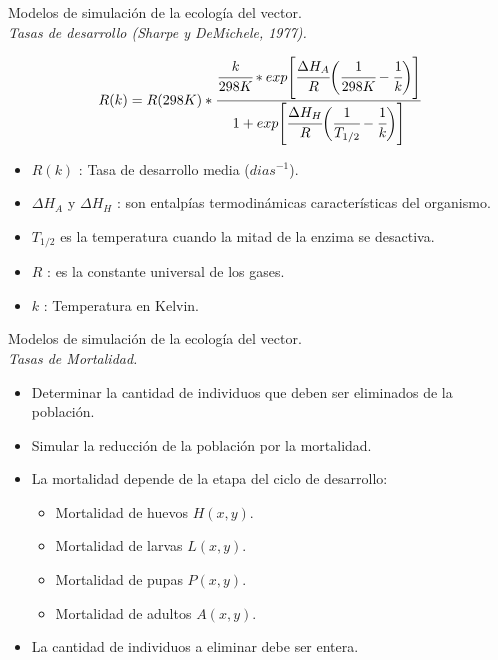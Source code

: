 \begin{frame}[t]{Modelos de simulación de la ecología del vector.\\\textit{Tasas de desarrollo
 (Sharpe y DeMichele, 1977).}}
  \begin{center}
      \begin{equation} \label{eq:schoolfield}
         R(k)  = R(298K) *\cfrac{ \cfrac{k}{298K} *
          exp \Bigg[
                  \cfrac{\Delta H_{A}}{R} \bigg(\cfrac{1}{298K} - \cfrac{1}{k}\bigg)
              \Bigg]}
          {1 + exp\Bigg[\cfrac{\Delta H_{H}}{R} \bigg(\cfrac{1}{T_{1/2}}- \cfrac{1}{k}\bigg)\Bigg] }
      \end{equation}
  \end{center}
   \begin{itemize}
      \item $R(k)$ : Tasa de desarrollo media ($dias^{-1}$).
      \item $\Delta H_{A}$ y $\Delta H_{H}$ : son entalpías termodinámicas características del organismo.
      \item $T_{1/2}$ es la temperatura cuando la mitad de la enzima se desactiva.
      \item $R$ : es la constante universal de los gases.
      \item $k$ : Temperatura en Kelvin.
    \end{itemize}
\end{frame}


\begin{frame}[c]{Modelos de simulación de la ecología del vector.\\\textit{Tasas de Mortalidad.}}
  \begin{itemize}
      \item Determinar la cantidad de individuos que deben ser eliminados de la población.
      \item Simular la reducción de la población por la mortalidad.
      \item La mortalidad depende de la etapa del ciclo de desarrollo:
      \begin{itemize}
		  \item Mortalidad de huevos $H(x, y)$.
		  \item Mortalidad de larvas $L(x,y)$.
		  \item Mortalidad de pupas $P(x,y)$.
		  \item Mortalidad de adultos $A(x,y)$.
      \end{itemize}
      \item La cantidad de individuos a eliminar debe ser entera.
  \end{itemize}
\end{frame}

